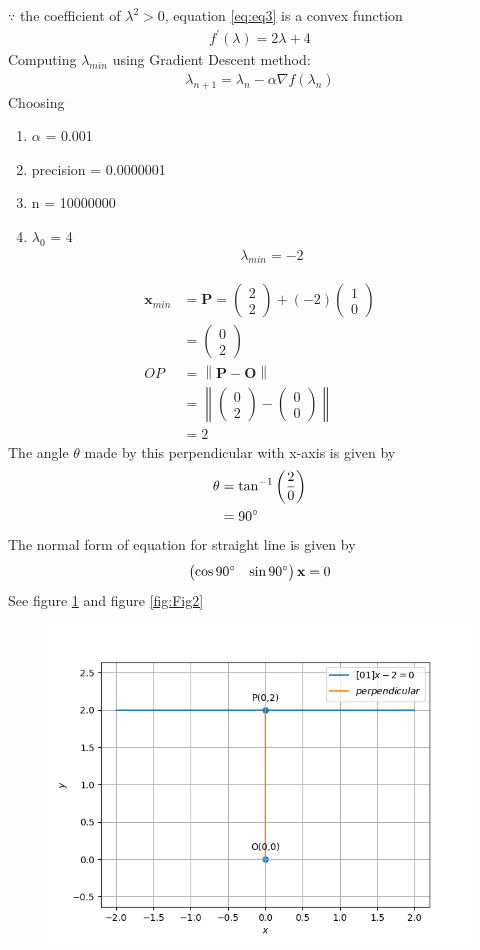 \documentclass[12pt]{article}
\providecommand{\brak}[1]{\ensuremath{\left(#1\right)}}
\providecommand{\norm}[1]{\left\lVert#1\right\rVert}
\newcommand{\myvec}[1]{\ensuremath{\begin{pmatrix}#1\end{pmatrix}}}
\let\vec\mathbf
\begin{document}
$\because$ the coefficient of $\lambda^2>0$, equation \eqref{eq:eq3} is a convex function
\begin{align}
	\label{eq:eq4}
	f^\prime\brak{\lambda} = 2\lambda+4
\end{align}
Computing $\lambda_{min}$ using Gradient Descent method:
\begin{align}
	\lambda_{n+1} = \lambda_n - \alpha\nabla f\brak{\lambda_n}
\end{align}
Choosing
\begin{enumerate}
\item $\alpha$ = 0.001
\item precision = 0.0000001
\item n = 10000000
\item $\lambda_0$ = 4
\begin{align}
	\lambda_{min} = -2
\end{align}
\end{enumerate}
\begin{align}
	\vec{x}_{min} &= \vec{P} = \myvec{2\\2}+\brak{-2}\myvec{1\\0}\\
	&= \myvec{0\\2}\\
	OP &= \norm{\vec{P}-\vec{O}}\\
	&= \norm{\myvec{0\\2}-\myvec{0\\0}}\\
	&= 2
\end{align}
The angle $\theta$ made by this perpendicular with x-axis is given by
\begin{align}
	\theta &= \tan^{-1}{\brak{\frac{2}{0}}}\\
	&= 90\degree
\end{align}
The normal form of equation for straight line is given by 
\begin{align}
	\myvec{\cos{90}\degree&\sin{90}\degree}\vec{x} = 0
\end{align}
See figure \ref{fig:Fig1} and figure \ref{fig:Fig2}
\begin{figure}[!h]
	\begin{center} 
	    \includegraphics[width=\columnwidth]{figs/opt1}
	\end{center}
\caption{}
\label{fig:Fig1}
\end{figure}
\end{document}
